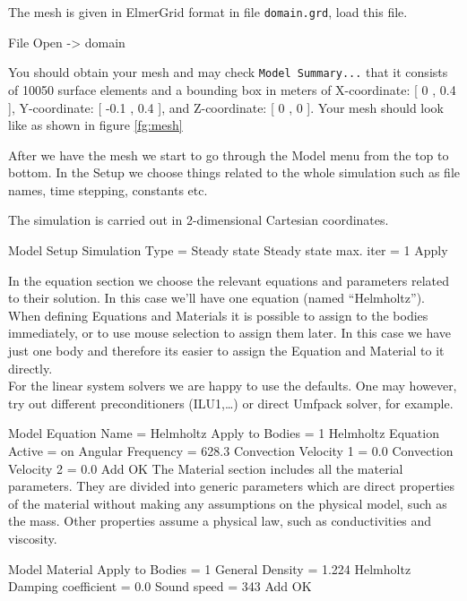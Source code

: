 The mesh is given in ElmerGrid format in file \texttt{domain.grd}, load this file.

\ttbegin
File 
  Open -> domain
\ttend

You should obtain your mesh and may check \texttt{Model Summary...} that it consists of 10050 surface elements and a bounding box in meters of X-coordinate: [ 0 ,  0.4 ], Y-coordinate: [ -0.1 ,  0.4 ], and Z-coordinate: [ 0 ,  0 ].  Your mesh should look like as shown in figure \ref{fg:mesh}

After we have the mesh we start to go through the Model menu from the top to bottom.  In the Setup we choose things related to the whole simulation such as file names, time stepping, constants etc.  

The simulation is carried out in 2-dimensional Cartesian coordinates.

\ttbegin
Model
  Setup 
    Simulation Type = Steady state
    Steady state max. iter = 1
  Apply
\ttend

In the equation section we choose the relevant equations and parameters related to their solution.  In this case we'll have one equation (named ``Helmholtz'').\\

When defining Equations and Materials it is possible to assign to the bodies immediately, or to use mouse selection to assign them later. In this case we have just one body and therefore its easier to assign the Equation and Material to it directly.\\

For the linear system solvers we are happy to use the defaults. One may however, try out different preconditioners (ILU1,\ldots) or direct Umfpack solver, for example.

\ttbegin
Model
  Equation
   Name = Helmholtz
    Apply to Bodies = 1
    Helmholtz Equation
      Active = on
      Angular Frequency = 628.3
      Convection Velocity 1 = 0.0
      Convection Velocity 2 = 0.0
    Add 
    OK
\ttend        
The Material section includes all the material parameters. They are divided into generic parameters which are direct properties of the material without making any assumptions on the physical model, such as the mass. Other properties assume a physical law, such as conductivities and viscosity. 

\ttbegin
Model
  Material
    Apply to Bodies = 1 
    General 
      Density = 1.224
    Helmholtz
      Damping coefficient = 0.0
      Sound speed = 343
    Add
    OK
\ttend

